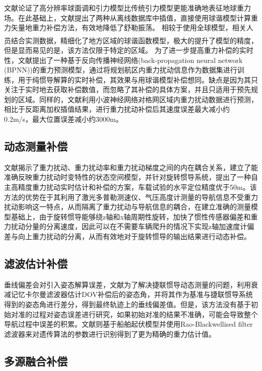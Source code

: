 \documentclass[12pt,a4,utf8]{article}
\newcommand{\upcite}[1]{\textsuperscript{\textsuperscript{\cite{#1}}}} %
\begin{document}
文献\cite{wang2016application}论证了高分辨率球面调和引力模型比传统引力模型更能准确地表征地球重力场。在此基础上，文献\cite{wu2016gravity}提出了两种从离线数据库中插值，直接使用球谐模型计算重力矢量地重力补偿方法，有效地降低了舒勒振荡。
相较于使用全球模型，相关人员结合实测数据，精细化了地方区域的球谐函数模型\upcite{zhu2019research,weng2020analysis}，极大的提升了模型的精度，但是显而易见的是，该方法仅限于特定的区域。
为了进一步提高重力补偿的实时性，文献\cite{gao2021real}提出了一种基于反向传播神经网络(back-propagation neural network (BPNN))的重力预测模型，通过将规划航区内重力扰动信息作为数据集进行训练，用于纯惯导解算的实时补偿，其效果与用球谐模型补偿想同。缺点是因为其只关注于实时地去获取补偿数值，而忽略了其补偿的具体方案，并且只适用于预先规划的区域。同样的，文献\cite{ZHOUXIAO2016}利用小波神经网络对格网区域内重力扰动数据进行预测，相比于反距离加权插值结果，进行重力扰动补偿后其速度误差最大减小约0.2m/s，最大位置误差减小约3000m。

\subsection{动态测量补偿}
文献\cite{yang2024autonomous}揭示了重力扰动、重力扰动率和重力扰动梯度之间的内在耦合关系，建立了能准确反映重力扰动时变特性的状态空间模型，并针对旋转惯导系统，提出了一种自主高精度重力扰动实时估计和补偿的方案，车载试验的水平定位精度优于50m。该方法的优势在于其利用了激光多普勒测速仪、气压高度计测量的导航信息不受重力扰动影响这一特点，从而隔离了重力扰动与导航信息的耦合，在建立准确的测量模型基础上，由于旋转惯导能够绕z轴和x轴周期性旋转，加快了惯性传感器偏差和重力扰动分量的分离速度，因此可以在不需要车辆爬升的情况下实现z轴加速度计偏差与向上重力扰动的分离，从而有效地对于旋转惯导的输出结果进行动态补偿。
\subsection{滤波估计补偿}
垂线偏差会对引入姿态解算误差，文献\cite{an2021method}为了解决捷联惯导动态测量的问题，利用衰减记忆卡尔曼滤波器估计DOV补偿后的姿态角，并将其作为基准与捷联惯导系统得到的姿态角进行差分，得到最终轨迹上的垂线偏差值。但是，该方法没有基于初始对准的过程对姿态误差进行研究，如果初始对准的结果不准确，可能会导致整个导航过程中误差的积累。文献\cite{stepanov2020algorithms}则基于船舶起伏模型并使用Rao-Blackwellised filter滤波器来对遗传算法的参数进行识别得到了更为精确的重力估计值。
\subsection{多源融合补偿}
\end{document}
